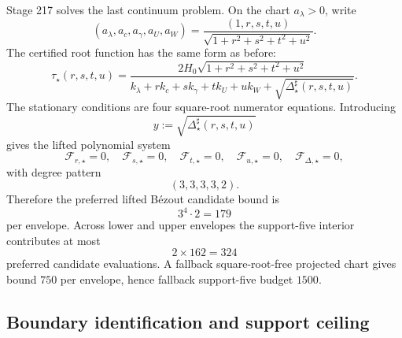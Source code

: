 Stage 217 solves the last continuum problem.  On the chart \(a_\lambda>0\), write
\begin{equation}
\label{eq:part06-five-ratio-coords}
(a_\lambda,a_c,a_\gamma,a_U,a_W)
=
\frac{(1,r,s,t,u)}{\sqrt{1+r^2+s^2+t^2+u^2}}.
\end{equation}
The certified root function has the same form as before:
\begin{equation}
\label{eq:part06-five-root}
\tau_\star(r,s,t,u)
=
\frac{2H_0\sqrt{1+r^2+s^2+t^2+u^2}}
{k_\lambda+rk_c+sk_\gamma+tk_U+uk_W+\sqrt{\Delta_\star^\sharp(r,s,t,u)}}.
\end{equation}
The stationary conditions are four square-root numerator equations.  Introducing
\begin{equation}
\label{eq:part06-five-y-def}
y:=\sqrt{\Delta_\star^\sharp(r,s,t,u)}
\end{equation}
gives the lifted polynomial system
\begin{equation}
\label{eq:part06-five-lifted-system}
\mathcal F_{r,\star}=0,
\quad
\mathcal F_{s,\star}=0,
\quad
\mathcal F_{t,\star}=0,
\quad
\mathcal F_{u,\star}=0,
\quad
\mathcal F_{\Delta,\star}=0,
\end{equation}
with degree pattern
\begin{equation}
\label{eq:part06-five-degree-pattern}
(3,3,3,3,2).
\end{equation}
Therefore the preferred lifted B\'ezout candidate bound is
\begin{equation}
\label{eq:part06-five-bezout}
3^4\cdot2=179
\end{equation}
per envelope.  Across lower and upper envelopes the support-five interior contributes at most
\begin{equation}
\label{eq:part06-five-budget}
2\times162=324
\end{equation}
preferred candidate evaluations.  A fallback square-root-free projected chart gives bound \(750\) per envelope, hence fallback support-five budget \(1500\).

\subsection{Boundary identification and support ceiling}
\label{subsec:part06-boundary-identification-support-ceiling}

